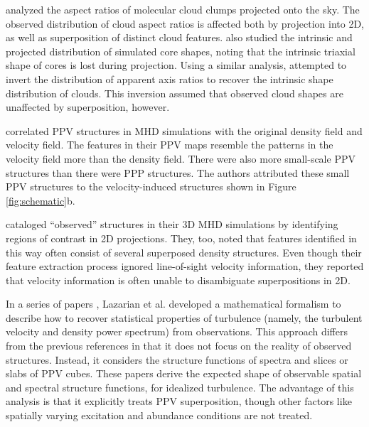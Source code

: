 \cite{http://adsabs.harvard.edu/abs/2003ApJ...592..203G} analyzed the aspect ratios of molecular cloud clumps projected onto the sky. The observed distribution of cloud aspect ratios is affected
both by projection into 2D, as well as superposition of distinct cloud features. \cite{http://adsabs.harvard.edu/abs/2009ApJ...693..914O} also studied the intrinsic and projected distribution of simulated core shapes, noting that the intrinsic triaxial shape of cores is lost during projection.
Using a similar analysis,  \cite{http://adsabs.harvard.edu/abs/2002ApJ...569..280J} attempted to invert the
distribution of apparent axis ratios to recover the intrinsic shape distribution of clouds. This inversion assumed that observed cloud shapes are unaffected by superposition, however.

\cite{http://adsabs.harvard.edu/abs/2000ApJ...532..353P}  correlated PPV structures in MHD simulations with the original density field and velocity field. The features in their PPV maps resemble the patterns in the velocity field more  than the density field. There were also more small-scale PPV structures than there were PPP structures. The authors attributed these small PPV structures to the velocity-induced structures shown in Figure \ref{fig:schematic}b.

\cite{http://adsabs.harvard.edu/abs/2001ApJ...546..980O} cataloged ``observed'' structures in their 3D MHD simulations by identifying regions of contrast in 2D projections. They, too, noted that features identified in this way often consist of several superposed density structures. Even though their feature extraction process ignored line-of-sight velocity information, they reported that velocity information is often unable to disambiguate superpositions in 2D.

In a series of papers \citep{http://adsabs.harvard.edu/abs/2000ApJ...537..720L, http://adsabs.harvard.edu/abs/2004ApJ...616..943L,
http://adsabs.harvard.edu/abs/2006ApJ...652.1348L}, Lazarian et al. developed a mathematical formalism to describe how to recover statistical properties of turbulence (namely, the turbulent velocity and density power spectrum) from observations. This approach differs from the previous references in that it does not focus on the reality of observed structures. Instead,
it considers the structure functions of spectra and slices or slabs of PPV cubes. These papers derive the expected shape of observable spatial and spectral structure functions, for idealized turbulence. The advantage of this analysis is that it explicitly treats PPV superposition, though other factors like spatially varying excitation and abundance conditions are not treated.


